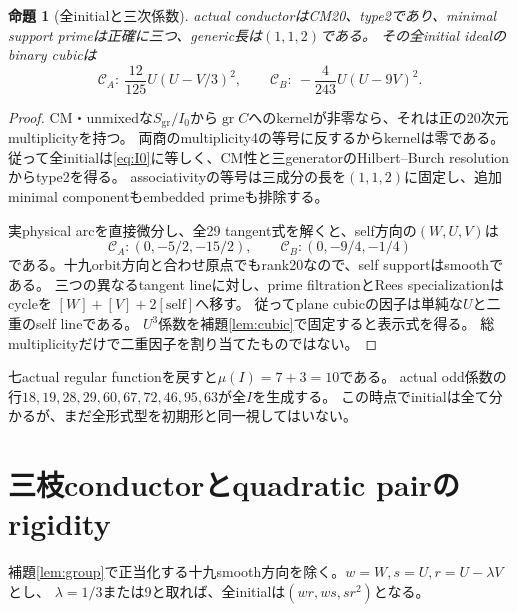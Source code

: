 \documentclass[11pt,a4paper]{ltjsarticle}
\newcommand{\CA}{\mathcal C_A}
\newcommand{\CB}{\mathcal C_B}
\newcommand{\gr}{\operatorname{gr}}
\newtheorem{proposition}[theorem]{命題}
\theoremstyle{definition}
\theoremstyle{remark}
\begin{document}
\begin{proposition}[全initialと三次係数]\label{prop:initial}
actual conductorはCM20、type2であり、minimal support primeは正確に三つ、generic長は$(1,1,2)$である。
その全initial idealのbinary cubicは
\[
 \CA:\ \frac{12}{125}U(U-V/3)^2,\qquad
 \CB:\ -\frac4{243}U(U-9V)^2.
\]
\end{proposition}
\begin{proof}
CM・unmixedな$S_{\mathrm{gr}}/I_0$から$\gr C$へのkernelが非零なら、それは正の20次元multiplicityを持つ。
両商のmultiplicity4の等号に反するからkernelは零である。
従って全initialは\eqref{eq:I0}に等しく、CM性と三generatorのHilbert--Burch resolutionからtype2を得る。
associativityの等号は三成分の長を$(1,1,2)$に固定し、追加minimal componentもembedded primeも排除する。

実physical arcを直接微分し、全29 tangent式を解くと、self方向の$(W,U,V)$は
\[
 \CA:(0,-5/2,-15/2),\qquad \CB:(0,-9/4,-1/4)
\]
である。十九orbit方向と合わせ原点でもrank20なので、self supportはsmoothである。
三つの異なるtangent lineに対し、prime filtrationとRees specializationはcycleを
$[W]+[V]+2[\mathrm{self}]$へ移す。
従ってplane cubicの因子は単純な$U$と二重のself lineである。
$U^3$係数を補題\ref{lem:cubic}で固定すると表示式を得る。
総multiplicityだけで二重因子を割り当てたものではない。
\end{proof}

七actual regular functionを戻すと$\mu(I)=7+3=10$である。
actual odd係数の行$18,19,28,29,60,67,72,46,95,63$が全$I$を生成する。
この時点でinitialは全て分かるが、まだ全形式型を初期形と同一視してはいない。

\section{三枝conductorとquadratic pairのrigidity}

補題\ref{lem:group}で正当化する十九smooth方向を除く。$w=W,s=U,r=U-\lambda V$とし、
$\lambda=1/3$または9と取れば、全initialは$(wr,ws,sr^2)$となる。
\end{document}
